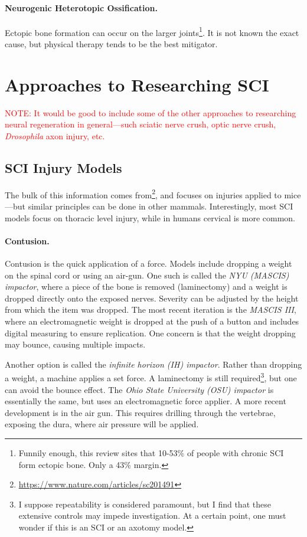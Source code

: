 \documentclass[12pt]{report}
\begin{document}
\subsubsection{Neurogenic Heterotopic Ossification.}
Ectopic bone formation can occur on the larger joints\footnote{Funnily enough, this review sites that 10-53\% of people with chronic SCI form ectopic bone. Only a 43\% margin.}. It is not known the exact cause, but physical therapy tends to be the best mitigator. 




\chapter{Approaches to Researching SCI}

\textcolor{red}{NOTE: It would be good to include some of the other approaches to researching neural regeneration in general---such sciatic nerve crush, optic nerve crush, \textit{Drosophila} axon injury, etc.}

\section{SCI Injury Models}
The bulk of this information comes from\footnote{\url{https://www.nature.com/articles/sc201491}}, and focuses on injuries applied to mice---but similar principles can be done in other mammals. Interestingly, most SCI models focus on thoracic level injury, while in humans cervical is more common. 

\subsubsection{Contusion.}
Contusion is the quick application of a force. Models include dropping a weight on the spinal cord or using an air-gun. One such is called the \textit{NYU (MASCIS) impactor}, where a piece of the bone is removed (laminectomy) and a weight is dropped directly onto the exposed nerves. Severity can be adjusted by the height from which the item was dropped. The most recent iteration is the \textit{MASCIS III}, where an electromagnetic weight is dropped at the push of a button and includes digital measuring to ensure replication. One concern is that the weight dropping may bounce, causing multiple impacts.\newline

Another option is called the \textit{infinite horizon (IH) impactor}. Rather than dropping a weight, a machine applies a set force. A laminectomy is still required\footnote{I suppose repeatability is considered paramount, but I find that these extensive controls may impede investigation. At a certain point, one must wonder if this is an SCI or an axotomy model.}, but one can avoid the bounce effect. The \textit{Ohio State University (OSU) impactor} is essentially the same, but uses an electromagnetic force applier. A more recent development is in the air gun. This requires drilling through the vertebrae, exposing the dura, where air pressure will be applied. 
\end{document}
